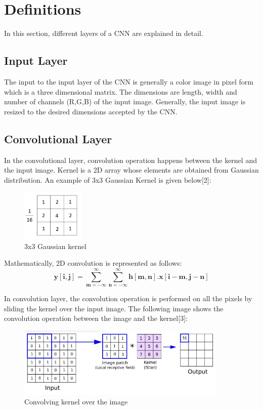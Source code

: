 \documentclass{IEEEtran}
\begin{document}
\section{Definitions}
In this section, different layers of a CNN are explained in detail.
\subsection{\textbf{Input Layer}}
The input to the input layer of the CNN is generally a color image in pixel form which is a three dimensional matrix. The dimensions are length, width and number of channels (R,G,B) of the input image. Generally, the input image is resized to the desired dimensions accepted by the CNN. 

\subsection{\textbf{Convolutional Layer}}
In the convolutional layer, convolution operation happens between the kernel and the input image. Kernel is a 2D array whose elements are obtained from Gaussian distribution. An example of 3x3 Gaussian Kernel is given below[2]:
\begin{figure}[h]
    \centering
    \captionsetup{justification=centering}
    \includegraphics[width=3cm]{Guassian kernel}
    \caption{3x3 Gaussian kernel }
    \label{fig:3x3 Guassian kernel}
\end{figure}

Mathematically, 2D convolution is represented as follows:
\begin{equation*}
\boldsymbol{y[i,j] = \sum_{m=-\infty}^{\infty}\sum_{n=-\infty}^{\infty} h[m,n] . x[i-m, j-n]}
\end{equation*}

In convolution layer, the convolution operation is performed on all the pixels by sliding the kernel over the input image. The following image shows the convolution operation between the image and the kernel[3]: 
\begin{figure}[h]
    \centering
    \captionsetup{justification=centering}
    \includegraphics[width=10cm]{conv2d}
    \caption{Convolving kernel over the image}
    \label{fig:3x3 Guassian kernel}
\end{figure}
\end{document}
